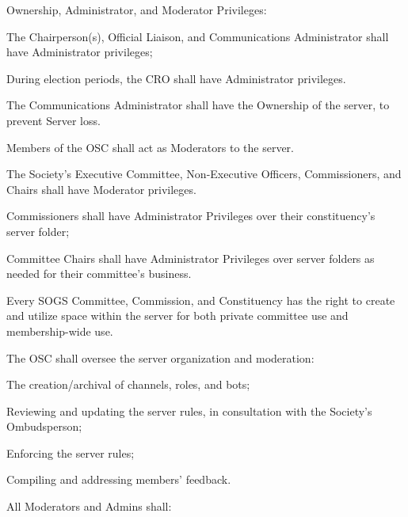 \begin{longenum}[ label*=\thesubsection.\arabic*., align=left] 
	\item Ownership, Administrator, and Moderator Privileges:
		\begin{longenum}[label*=\arabic*., align=left]
		\item The Chairperson(s), Official Liaison, and Communications Administrator shall have Administrator privileges;
			\begin{longenum}[label*=\arabic*., align=left]
			\item During election periods, the CRO shall have Administrator privileges.
			\end{longenum}	
		\item The Communications Administrator shall have the Ownership of the server, to prevent Server loss.
		\item Members of the OSC shall act as Moderators to the server.
		\item The Society's Executive Committee, Non-Executive Officers, Commissioners, and Chairs shall have Moderator privileges.
			\begin{longenum}[label*=\arabic*., align=left]
			\item Commissioners shall have Administrator Privileges over their constituency's server folder;
			\item Committee Chairs shall have Administrator Privileges over server folders as needed for their committee's business.
			\end{longenum}	
		\end{longenum}	
	\item Every SOGS Committee, Commission, and Constituency has the right to create and utilize space within the server for both private committee use and membership-wide use.
	\item The OSC shall oversee the server organization and moderation:
		\begin{longenum}[label*=\arabic*., align=left]
		\item The creation/archival of channels, roles, and bots;
		\item Reviewing and updating the server rules, in consultation with the Society's Ombudsperson;
		\item Enforcing the server rules;
		\item Compiling and addressing members' feedback.
		\end{longenum}	
	\item All Moderators and Admins shall:

\end{longenum}
